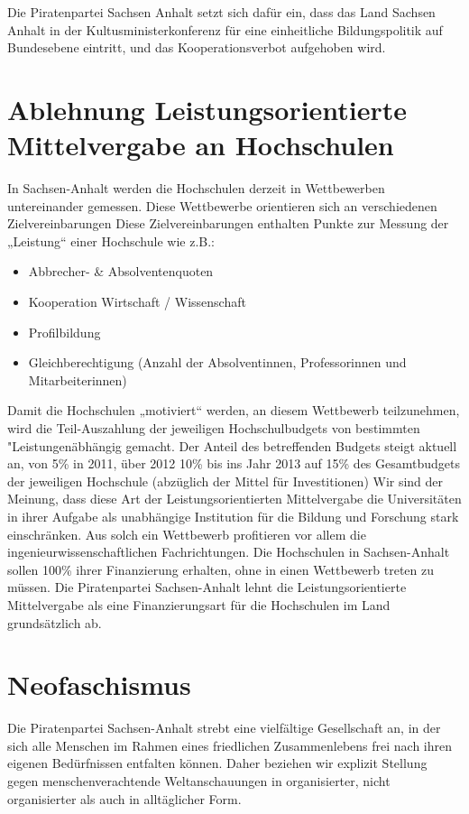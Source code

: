 Die Piratenpartei Sachsen Anhalt setzt sich dafür ein, dass das Land Sachsen
Anhalt in der Kultusministerkonferenz für eine einheitliche Bildungspolitik auf
Bundesebene eintritt, und das Kooperationsverbot aufgehoben wird.

\section{Ablehnung Leistungsorientierte Mittelvergabe an Hochschulen}

In Sachsen-Anhalt werden die Hochschulen derzeit in Wettbewerben untereinander
gemessen. Diese Wettbewerbe orientieren sich an verschiedenen Zielvereinbarungen
Diese Zielvereinbarungen enthalten Punkte zur Messung der „Leistung“ einer
Hochschule wie z.B.:
\begin{itemize}
\item Abbrecher- \& Absolventenquoten
\item Kooperation Wirtschaft / Wissenschaft
\item Profilbildung
\item Gleichberechtigung (Anzahl der Absolventinnen, Professorinnen und
Mitarbeiterinnen)
\end{itemize}
Damit die Hochschulen „motiviert“ werden, an diesem Wettbewerb teilzunehmen,
wird die Teil-Auszahlung der jeweiligen Hochschulbudgets von bestimmten
"Leistungenäbhängig gemacht. Der Anteil des betreffenden Budgets steigt aktuell
an, von 5\% in 2011, über 2012 10\% bis ins Jahr 2013 auf 15\% des Gesamtbudgets
der jeweiligen Hochschule (abzüglich der Mittel für Investitionen) Wir sind der
Meinung, dass diese Art der Leistungsorientierten Mittelvergabe die
Universitäten in ihrer Aufgabe als unabhängige Institution für die Bildung und
Forschung stark einschränken. Aus solch ein Wettbewerb profitieren vor allem die
ingenieurwissenschaftlichen Fachrichtungen.
Die Hochschulen in Sachsen-Anhalt sollen 100\% ihrer Finanzierung erhalten, ohne
in einen Wettbewerb treten zu müssen. Die Piratenpartei Sachsen-Anhalt lehnt die
Leistungsorientierte Mittelvergabe als eine Finanzierungsart für die Hochschulen
im Land grundsätzlich ab.

\section{Neofaschismus}

Die Piratenpartei Sachsen-Anhalt strebt eine vielfältige Gesellschaft an, in der
sich alle Menschen im Rahmen eines friedlichen Zusammenlebens frei nach ihren
eigenen Bedürfnissen entfalten können. Daher beziehen wir explizit Stellung
gegen menschenverachtende Weltanschauungen in organisierter, nicht organisierter
als auch in alltäglicher Form.
